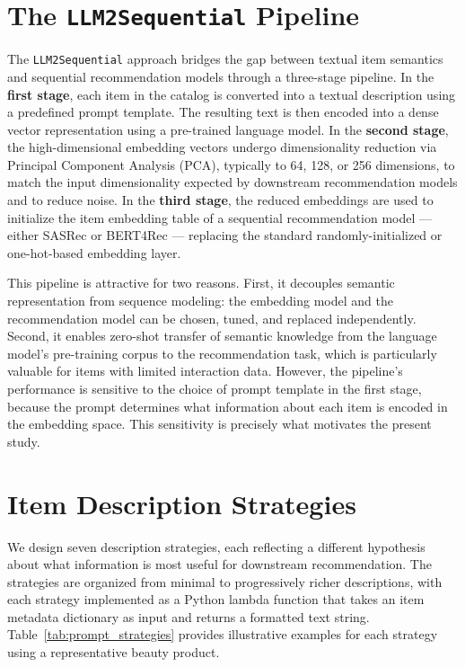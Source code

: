 \documentclass[12pt,a4paper]{report}
\begin{document}
\section{The \protect\texttt{LLM2Sequential} Pipeline}
\label{sec:llm2seq_pipeline}

The \texttt{LLM2Sequential} approach \citep{boz2025} bridges the gap between
textual item semantics and sequential recommendation models through a
three-stage pipeline. In the \textbf{first stage}, each item in the catalog is
converted into a textual description using a predefined prompt template. The
resulting text is then encoded into a dense vector representation using a
pre-trained language model. In the \textbf{second stage}, the high-dimensional
embedding vectors undergo dimensionality reduction via Principal Component
Analysis (PCA), typically to 64, 128, or 256 dimensions, to match the input
dimensionality expected by downstream recommendation models and to reduce
noise. In the \textbf{third stage}, the reduced embeddings are used to
initialize the item embedding table of a sequential recommendation model —
either SASRec \citep{kang2018sasrec} or BERT4Rec \citep{sun2019bert4rec} —
replacing the standard randomly-initialized or one-hot-based embedding layer.

This pipeline is attractive for two reasons. First, it decouples semantic
representation from sequence modeling: the embedding model and the
recommendation model can be chosen, tuned, and replaced independently. Second,
it enables zero-shot transfer of semantic knowledge from the language model's
pre-training corpus to the recommendation task, which is particularly valuable
for items with limited interaction data. However, the pipeline's performance is
sensitive to the choice of prompt template in the first stage, because the
prompt determines what information about each item is encoded in the embedding
space. This sensitivity is precisely what motivates the present study.

\section{Item Description Strategies}
\label{sec:prompt_strategies}

We design seven description strategies, each reflecting a different hypothesis
about what information is most useful for downstream recommendation. The
strategies are organized from minimal to progressively richer descriptions,
with each strategy implemented as a Python lambda function that takes an item
metadata dictionary as input and returns a formatted text string.
Table~\ref{tab:prompt_strategies} provides illustrative examples for each
strategy using a representative beauty product.
\end{document}

